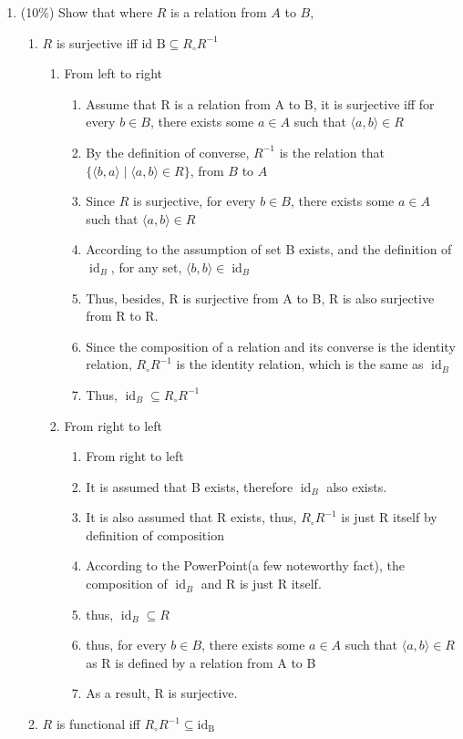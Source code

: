 \documentclass[10pt]{article}
\begin{document}
\begin{enumerate}
  \item (10\%) Show that where $R$ is a relation from $A$ to $B$,
  \begin{enumerate}
    \item $R$ is surjective iff id $\mathrm{B} \subseteq R_{\circ} R^{-1}$
    \begin{enumerate}
      \item From left to right
      \begin{enumerate}
        \item Assume that R is a relation from A to B, it is surjective iff for every $b \in B$, there exists some $a \in A$ such that $\langle a, b\rangle \in R$
        \item By the definition of converse, $R^{-1}$ is the relation that $\{\langle b, a\rangle \mid \langle a, b\rangle \in R\}$, from $B$ to $A$
        \item Since $R$ is surjective, for every $b \in B$, there exists some $a \in A$ such that $\langle a, b\rangle \in R$
        \item According to the assumption of set B exists, and the definition of $\operatorname{id}_{B}$, for any set, $\langle b, b\rangle \in \operatorname{id}_{B}$
        \item Thus, besides, R is surjective from A to B, R is also surjective from R to R.
        \item Since the composition of a relation and its converse is the identity relation, $R_{\circ} R^{-1}$ is the identity relation, which is the same as $\operatorname{id}_{B}$
        \item Thus, $\operatorname{id}_{B} \subseteq R_{\circ} R^{-1}$
      \end{enumerate}
    \item From right to left
      \begin{enumerate}
        \item From right to left
        \item It is assumed that B exists, therefore $\operatorname{id}_{B}$ also exists.
        \item It is also assumed that R exists, thus, $R_{\circ} R^{-1}$ is just R itself by definition of composition
        \item According to the PowerPoint(a few noteworthy fact), the composition of $\operatorname{id}_{B}$ and R is just R itself. 
        \item thus, $\operatorname{id}_{B} \subseteq R$
        \item thus, for every $b \in B$, there exists some $a \in A$ such that $\langle a, b\rangle \in R$ as R is defined by a relation from A to B
        \item As a result, R is surjective.
      \end{enumerate}
    \end{enumerate}
    \item $R$ is functional iff $R_{\circ} R^{-1} \subseteq \mathrm{id}_{\mathrm{B}}$
  \end{enumerate}
\end{enumerate}
\end{document}
